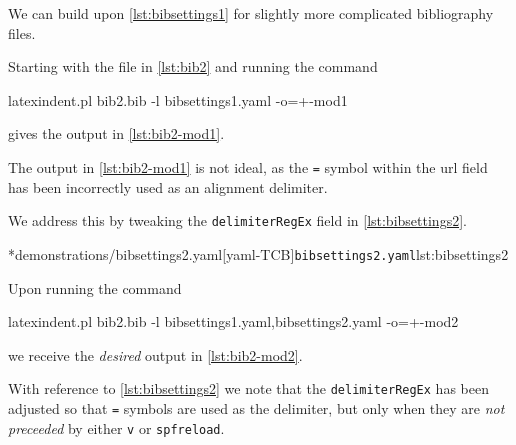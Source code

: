  \begin{example}
	 We can build upon \cref{lst:bibsettings1} for slightly more complicated bibliography files.

	 Starting with the file in \cref{lst:bib2} and running the command
	 \begin{commandshell}
latexindent.pl bib2.bib -l bibsettings1.yaml -o=+-mod1 
   \end{commandshell}
	 gives the output in \cref{lst:bib2-mod1}.

	 \begin{widepage}
	 \end{widepage}

	 The output in \cref{lst:bib2-mod1} is not ideal, as the \texttt{=} symbol within the url
	 field has been incorrectly used as an alignment delimiter.

	 We address this by tweaking the \texttt{delimiterRegEx} field in \cref{lst:bibsettings2}.

	 \cmhlistingsfromfile[style=yaml-LST]*{demonstrations/bibsettings2.yaml}[yaml-TCB]{\texttt{bibsettings2.yaml}}{lst:bibsettings2}

	 Upon running the command
	 \begin{commandshell}
latexindent.pl bib2.bib -l bibsettings1.yaml,bibsettings2.yaml -o=+-mod2 
         \end{commandshell}
	 we receive the \emph{desired} output in \cref{lst:bib2-mod2}.


	 With reference to \cref{lst:bibsettings2} we note that the \texttt{delimiterRegEx} has been adjusted so that \texttt{=} symbols are used as the delimiter,
	 but only when they are \emph{not preceeded} by either \texttt{v} or \texttt{spfreload}.
 \end{example}

